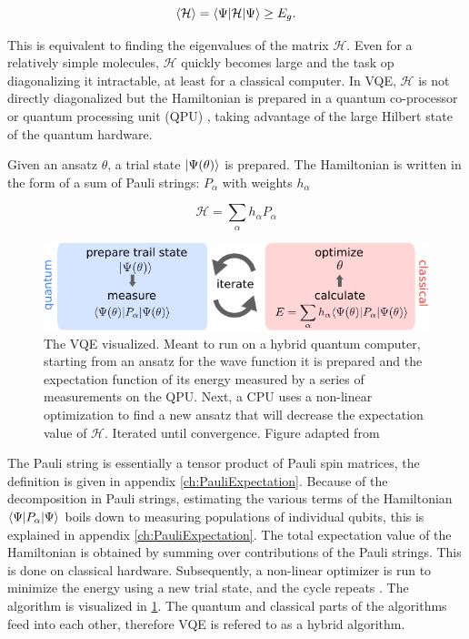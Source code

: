 \begin{equation}\label{eq:VariationalPrinciple}
	\left\langle \mathcal{H} \right\rangle = \langle\Psi\rvert\mathcal{H} \lvert\Psi\rangle \geq E_g.
\end{equation}

This is equivalent to finding the eigenvalues of the matrix $\mathcal{H}$. Even for a relatively simple molecules, $\mathcal{H}$ quickly becomes large and the task op diagonalizing it intractable, at least for a classical computer. In VQE, $\mathcal{H}$ is not directly diagonalized but the Hamiltonian is prepared in a quantum co-processor or quantum processing unit (QPU) \cite{Henriet2020,Peruzzo2014}, taking advantage of the large Hilbert state of the quantum hardware. 

Given an ansatz $\theta$, a trial state $\lvert\Psi(\theta)\rangle$ is prepared. The Hamiltonian is written in the form of a sum of Pauli strings: $P_{\alpha}$ with weights $h_{\alpha}$ \cite{McClean2016,Moll2018}

\begin{equation}\label{eq:PauliDecomposition}
	\mathcal{H} = \sum_{\alpha} h_{\alpha} P_{\alpha}
\end{equation}

\begin{figure}
	\centering
	\includegraphics[width=0.75\linewidth]{figures/VQE.pdf}
	\caption{The VQE visualized. Meant to run on a hybrid quantum computer, starting from an ansatz for the wave function it is prepared and the expectation function of its energy measured by a series of measurements on the QPU. Next, a CPU uses a non-linear optimization to find a new ansatz that will decrease the expectation value of $\mathcal{H}$. Iterated until convergence. Figure adapted from \cite{Moll2018}}
	\label{fig:VQE}
\end{figure}

The Pauli string is essentially a tensor product of Pauli spin matrices, the definition is given in appendix \ref{ch:PauliExpectation}. Because of the decomposition in Pauli strings, estimating the various terms of the Hamiltonian $\langle\Psi\rvert P_{\alpha} \lvert\Psi\rangle$ boils down to measuring populations of individual qubits, this is explained in appendix \ref{ch:PauliExpectation}. The total expectation value of the Hamiltonian is obtained by summing over contributions of the Pauli strings. This is done on classical hardware. Subsequently, a non-linear optimizer is run to minimize the energy using a new trial state, and the cycle repeats \cite{Moll2018}. The algorithm is visualized in \cref{fig:VQE}. The quantum and classical parts of the algorithms feed into each other, therefore VQE is refered to as a hybrid algorithm. 


